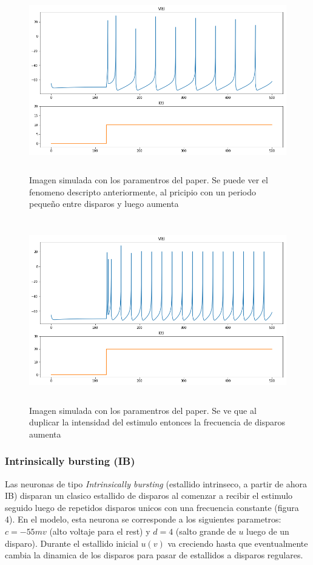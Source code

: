 \documentclass[12pt]{article}
\begin{document}
\begin{figure}[h]
    \centering
        \includegraphics[height=8cm]{images/RS_I10.png}
    \caption[fontsize=2pt]{Imagen simulada con los paramentros del paper. Se puede ver el fenomeno descripto anteriormente, al pricipio con un periodo pequeño entre disparos y luego aumenta}
\end{figure}

\begin{figure}[h!]
    \centering
        \includegraphics[height=8cm]{images/RS_I20.png}
    \caption[fontsize=2pt]{Imagen simulada con los paramentros del paper. Se ve que al duplicar la intensidad del estimulo entonces la frecuencia de disparos aumenta}
\end{figure}
 \newpage

\subsubsection{Intrinsically bursting (IB)}

Las neuronas de tipo \textit{Intrinsically bursting} (estallido intrinseco, a partir de ahora IB)
disparan un clasico estallido de disparos al comenzar a recibir el estimulo seguido luego de repetidos disparos unicos con una frecuencia constante (figura 4).
En el modelo, esta neurona se corresponde a los siguientes parametros: $c = -55 mv$ (alto voltaje para el rest) y $d = 4$ (salto grande de $u$ luego de un disparo).
Durante el estallido inicial $u(v)$ va creciendo hasta que eventualmente cambia la dinamica de los disparos para pasar de estallidos a disparos regulares. \\
\end{document}
